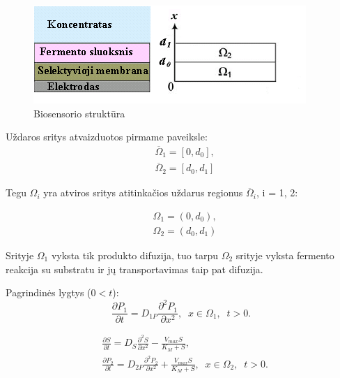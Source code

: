 \documentclass[12pt, a4paper, lithuanian]{article}
\begin{document}
\begin{figure}[H]
    \centering
    \includegraphics[scale=0.9]{img/modv1}
    \caption{Biosensorio struktūra}
    \label{img:mlp}
\end{figure}

Uždaros sritys atvaizduotos pirmame paveiksle:
\begin{equation}
\begin{aligned}
    &\overline{\Omega}_1 = [0, d_0],\\
    &\overline{\Omega}_2 = [d_0, d_1]
\end{aligned}
\end{equation}

Tegu $\Omega_i$ yra atviros sritys atitinkačios uždarus regionus
$\overline{\Omega}_i$, i = 1, 2:

\begin{equation}
\begin{aligned}
    &\Omega_1 = (0, d_0),\\
    &\Omega_2 = (d_0, d_1)
\end{aligned}
\end{equation}

Srityje $\Omega_1$ vyksta tik produkto
difuzija, tuo tarpu $\Omega_2$ srityje vyksta fermento
reakcija su substratu ir jų transportavimas taip pat difuzija.

Pagrindinės lygtys ($0<t$):
\begin{equation}
    \frac{\partial P_1}{\partial t} = D_{1P} \frac{\partial^2 P_1}{\partial x^2}, \;
    \; x \in \Omega_1,\;\; t > 0.
\end{equation}

\begin{equation}
\begin{aligned} 
    &\frac{\partial S}{\partial t} = D_S \frac{\partial^2 S}{\partial x^2} -
    \frac{V_{max} S}{K_M + S},  \\ 
    &\frac{\partial P_2}{\partial t} = D_{2P} \frac{\partial^2 P_2}{\partial x^2} +
    \frac{V_{max} S}{K_M + S}, \; \; x \in \Omega_2 ,\;\; t > 0.
\end{aligned}
\end{equation}
\end{document}
